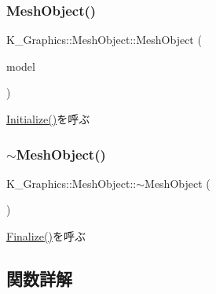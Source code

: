 \subsubsection{\texorpdfstring{Mesh\+Object()}{MeshObject()}}
{\footnotesize\ttfamily K\+\_\+\+Graphics\+::\+Mesh\+Object\+::\+Mesh\+Object (\begin{DoxyParamCaption}\item[{\mbox{\hyperlink{class_k___graphics_1_1_mesh_model}{Mesh\+Model}} $\ast$}]{model }\end{DoxyParamCaption})}



\mbox{\hyperlink{class_k___graphics_1_1_mesh_object_a248233630419973244851f5d2070b5aa}{Initialize()}}を呼ぶ 

\mbox{\label{class_k___graphics_1_1_mesh_object_ae8c3f648521b8c14da19fa53fe1656f3}} 
\subsubsection{\texorpdfstring{$\sim$\+Mesh\+Object()}{~MeshObject()}}
{\footnotesize\ttfamily K\+\_\+\+Graphics\+::\+Mesh\+Object\+::$\sim$\+Mesh\+Object (\begin{DoxyParamCaption}{ }\end{DoxyParamCaption})}



\mbox{\hyperlink{class_k___graphics_1_1_mesh_object_a2d7f1695e98aeba276e2f61b0bca00ab}{Finalize()}}を呼ぶ 



\subsection{関数詳解}
\mbox{\label{class_k___graphics_1_1_mesh_object_a86437d928a10a4ceaa0ccdb1ed174028}} 
